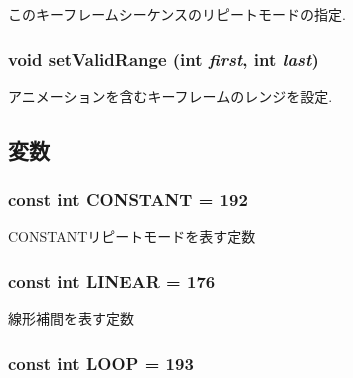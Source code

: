 このキーフレームシーケンスのリピートモードの指定. \hypertarget{classm3g_1_1KeyframeSequence_b5a824131cef547816366141afe0339a}{
\subsubsection[{setValidRange}]{\setlength{\rightskip}{0pt plus 5cm}void setValidRange (int {\em first}, \/  int {\em last})}}
\label{classm3g_1_1KeyframeSequence_b5a824131cef547816366141afe0339a}


アニメーションを含むキーフレームのレンジを設定. 

\subsection{変数}
\hypertarget{classm3g_1_1KeyframeSequence_b45ff833865ae8962be27923995f91a3}{
\subsubsection[{CONSTANT}]{\setlength{\rightskip}{0pt plus 5cm}const int {\bf CONSTANT} = 192}}
\label{classm3g_1_1KeyframeSequence_b45ff833865ae8962be27923995f91a3}


CONSTANTリピートモードを表す定数 \hypertarget{classm3g_1_1KeyframeSequence_23ccf193c67257f1be26417041cecb31}{
\subsubsection[{LINEAR}]{\setlength{\rightskip}{0pt plus 5cm}const int {\bf LINEAR} = 176}}
\label{classm3g_1_1KeyframeSequence_23ccf193c67257f1be26417041cecb31}


線形補間を表す定数 \hypertarget{classm3g_1_1KeyframeSequence_ecc439231d4f3639e6f6a9625615a0f7}{
\subsubsection[{LOOP}]{\setlength{\rightskip}{0pt plus 5cm}const int {\bf LOOP} = 193}}
\label{classm3g_1_1KeyframeSequence_ecc439231d4f3639e6f6a9625615a0f7}


